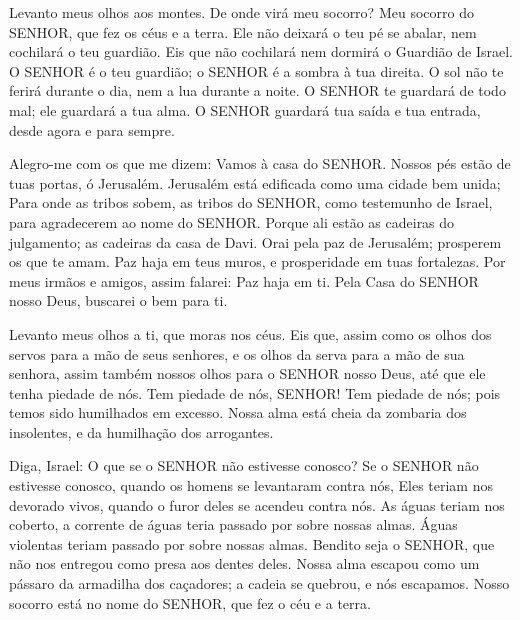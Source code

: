
{\PP 
  Levanto meus olhos aos montes. De onde virá meu socorro?
  Meu socorro
{} do SENHOR, que fez os céus e a terra.
  Ele não deixará o teu pé se abalar, nem cochilará o teu guardião.
  Eis que não cochilará nem dormirá o Guardião de Israel.
  O SENHOR é o teu guardião; o SENHOR é a sombra à tua direita.
  O sol não te ferirá durante o dia, nem a lua durante a noite.
  O SENHOR te guardará de todo mal; ele guardará a tua alma.
  O SENHOR guardará tua saída e tua entrada, desde agora e para sempre.
\par }


{\PP 
  Alegro-me com os que me dizem: Vamos à casa do SENHOR.
  Nossos pés estão
{} de tuas portas, ó Jerusalém.
  Jerusalém está edificada como uma cidade bem unida;
  Para onde as tribos sobem, as tribos do SENHOR, como testemunho de Israel, para agradecerem ao nome do SENHOR.
  Porque ali estão as cadeiras do julgamento; as cadeiras da casa de Davi.
  Orai pela paz de Jerusalém; prosperem os que te amam.
  Paz haja em teus muros, e prosperidade em tuas fortalezas.
  Por meus irmãos e amigos, assim falarei: Paz haja em ti.
  Pela Casa do SENHOR nosso Deus, buscarei o bem para ti.
\par }


{\PP 
  Levanto meus olhos a ti, que moras nos céus.
  Eis que, assim como os olhos dos servos
{} para a mão de seus senhores, e os olhos da serva para a mão de sua senhora, assim também nossos olhos
{} para o SENHOR nosso Deus, até que ele tenha piedade de nós.
  Tem piedade de nós, SENHOR! Tem piedade de nós; pois temos sido humilhados em excesso.
  Nossa alma está cheia da zombaria dos insolentes, e da humilhação dos arrogantes.
\par }


{\PP 
  Diga, Israel: O que
{} se o SENHOR não estivesse conosco?
  Se o SENHOR não estivesse conosco, quando os homens se levantaram contra nós,
  Eles teriam nos devorado vivos, quando o furor deles se acendeu contra nós.
  As águas teriam nos coberto,
{} a corrente de águas teria passado por sobre nossas almas.
  Águas violentas teriam passado por sobre nossas almas.
  Bendito seja o SENHOR, que não nos entregou como presa aos dentes deles.
  Nossa alma escapou como um pássaro da armadilha dos caçadores; a cadeia se quebrou, e nós escapamos.
  Nosso socorro está no nome do SENHOR, que fez o céu e a terra.
\par }

